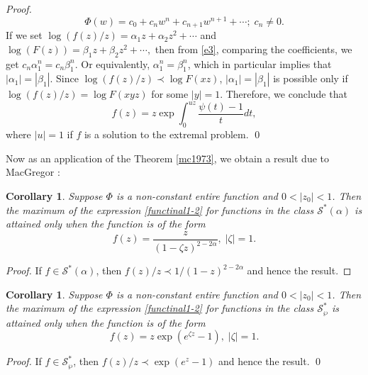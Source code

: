 \documentclass[12pt, reqno]{amsart}
\numberwithin{equation}{section}
\theoremstyle{plain}
\newtheorem{corollary}[theorem]{Corollary}
\theoremstyle{definition}
\theoremstyle{remark}
\begin{document}
\begin{proof}
	$$\Phi(w)=c_0+c_nw^n+c_{n+1}w^{n+1}+\cdots;\; c_n\neq0.$$
	If we set $\log(f(z)/z)=\alpha_1z+\alpha_2z^2+\cdots$ and $\log(F(z))=\beta_1z+\beta_2z^2+\cdots,$ then from \eqref{e3}, comparing the coefficients, we get $c_n\alpha^n_1=c_n\beta^n_1.$ Or equivalently, $\alpha^n_1=\beta^n_1$, which in particular implies that $|\alpha_1|=|\beta_1|$. Since $\log(f(z)/z)\prec \log{F(xz)}$, $|\alpha_1|=|\beta_1|$ is possible only if $\log(f(z)/z)= \log{F(xyz)}$ for some $|y|=1$. Therefore, we conclude that 
	$$f(z)=z\exp\int_{0}^{uz}\frac{\psi(t)-1}{t}dt,$$
	where $|u|=1$ if $f$ is a solution to the extremal problem. \qed
\end{proof}
Now as an application of the Theorem \ref{mc1973}, we obtain a result due to MacGregor \cite{T.H.Mac1973}:
\begin{corollary}\cite{T.H.Mac1973}
	Suppose $\Phi$ is a non-constant entire function and $0<|z_0|<1$. Then the maximum of the expression \eqref{functinal1-2} for functions in the class $\mathcal{S}^{*}(\alpha)$ is attained only when the function is of the form 
	\begin{equation*}
	f(z)=\frac{z}{(1-\zeta z)^{2-2\alpha}},\; |\zeta|=1.
	\end{equation*}
\end{corollary}
\begin{proof}
	If $f\in \mathcal{S}^*(\alpha)$, then $f(z)/z \prec 1/(1-z)^{2-2\alpha}$ and hence the result. 
\end{proof}

\begin{corollary}
	Suppose $\Phi$ is a non-constant entire function and $0<|z_0|<1$. Then the maximum of the expression \eqref{functinal1-2} for functions in the class $\mathcal{S}^{*}_{\wp}$ is attained only when the function is of the form 
	\begin{equation*}
	f(z)=z\exp(e^{\zeta z}-1),\; |\zeta|=1.
	\end{equation*}
\end{corollary}
\begin{proof}
	If $f\in \mathcal{S}^*_{\wp}$, then $f(z)/z \prec \exp{(e^z-1)}$ and hence the result. \qed
\end{proof}
\end{document}
